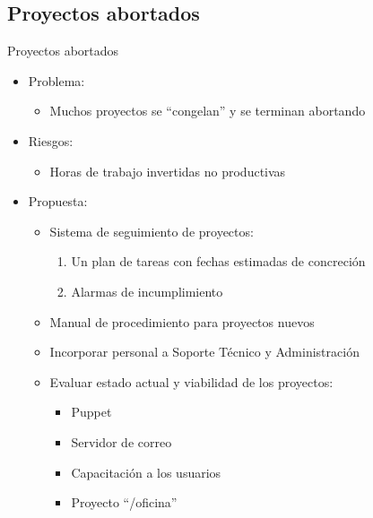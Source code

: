 \documentclass[spanish]{beamer}
\begin{document}
\subsection{Proyectos abortados}
\begin{frame}{Proyectos abortados}
  \begin{itemize}
  \item Problema:
    \begin{itemize}
    \item Muchos proyectos se ``congelan'' y se terminan abortando
    \end{itemize}
  \item Riesgos:
    \begin{itemize}
    \item Horas de trabajo invertidas no productivas
    \end{itemize}
  \item Propuesta:
    \begin{itemize}
    \item Sistema de seguimiento de proyectos:
      \begin{enumerate}
      \item Un plan de tareas con fechas estimadas de concreción
      \item Alarmas de incumplimiento
      \end{enumerate}
    \item Manual de procedimiento para proyectos nuevos
    \item Incorporar personal a Soporte Técnico y Administración
    \item Evaluar estado actual y viabilidad de los proyectos:
      \begin{itemize}
      \item Puppet
      \item Servidor de correo
      \item Capacitación a los usuarios
      \item Proyecto ``/oficina''
      \end{itemize}
    \end{itemize}
  \end{itemize}
\end{frame}

\end{document}
